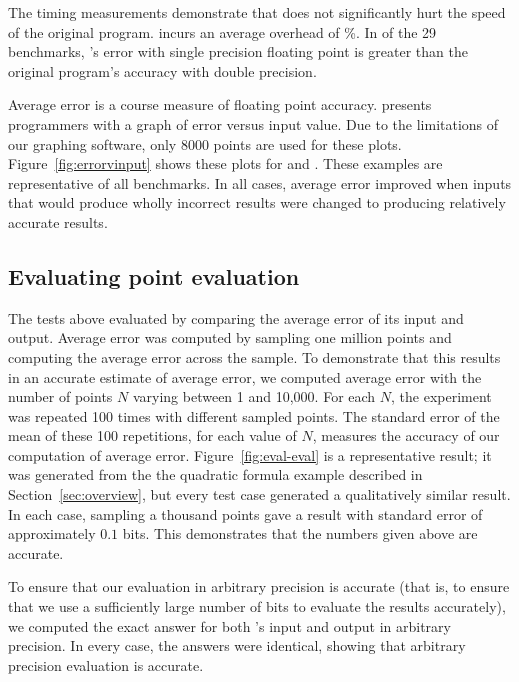 \documentclass[paper.tex]{subfiles}
\begin{document}
The timing measurements demonstrate
  that \casio does not significantly hurt the speed of the original program.
\casio incurs an average overhead of \%.
In  of the 29 benchmarks,
  \casio's error with single precision floating point
  is greater than the original program's accuracy with double precision.

Average error is a course measure of floating point accuracy.
\casio presents programmers with a graph of error versus input value.
Due to the limitations of our graphing software,
  only 8000 points are used for these plots.
Figure~\ref{fig:errorvinput} shows these plots for
   and .
These examples are representative of all benchmarks.
In all cases, average error improved
  when inputs that would produce wholly incorrect results
  were changed to producing relatively accurate results.

\subsection{Evaluating point evaluation}\label{sec:eval-eval}

The tests above evaluated \casio by comparing the average error
  of its input and output.
Average error was computed by sampling one million points
  and computing the average error across the sample.
To demonstrate that this results in an accurate estimate of average error,
  we computed average error with the number of points $N$ varying
  between 1 and 10,000.
For each $N$, the experiment was repeated 100 times
  with different sampled points.
The standard error of the mean of these 100 repetitions, for each value of $N$,
  measures the accuracy of our computation of average error.
Figure~\ref{fig:eval-eval} is a representative result;
  it was generated from the the quadratic formula example
  described in Section~\ref{sec:overview},
  but every test case generated a qualitatively similar result.
In each case, sampling a thousand points gave a result
  with standard error of approximately $0.1$ bits.
This demonstrates that the numbers given above
  are accurate.

To ensure that our evaluation in arbitrary precision is accurate
  (that is, to ensure that we use a sufficiently large number of bits
  to evaluate the results accurately),
  we computed the exact answer for both \casio's input and output
  in arbitrary precision.
In every case, the answers were identical,
  showing that arbitrary precision evaluation is accurate.
\end{document}
